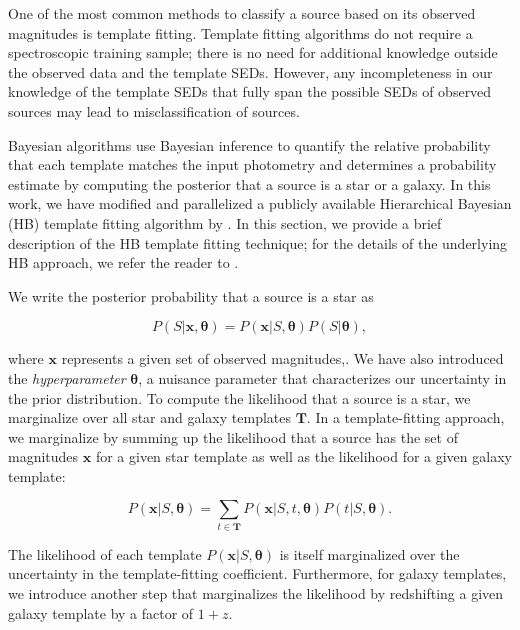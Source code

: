 \documentclass[useAMS,usenatbib]{mn2e}
\begin{document}
One of the most common methods to classify a source
based on its observed magnitudes is template fitting.
Template fitting algorithms do not require a spectroscopic training sample;
there is no need for additional knowledge outside the
observed data and the template SEDs.
However, any incompleteness in our knowledge of the template SEDs
that fully span the possible SEDs of observed sources
may lead to misclassification of sources.

Bayesian algorithms use Bayesian inference to quantify
the relative probability that each template matches
the input photometry
and determines a probability estimate by computing
the posterior that a source is a star or a galaxy.
In this work, we have modified and parallelized
a publicly available Hierarchical Bayesian (HB) template fitting
algorithm by \cite{Fadely2012}.
In this section, we provide a brief description
of the HB template fitting technique;
for the details of the underlying HB approach,
we refer the reader to \cite{Fadely2012}.

We write the posterior probability that a source is a star as

\begin{equation}
P \left( S | \mathbf{x}, \mathbf{\theta} \right)
= P \left( \mathbf{x} | S, \mathbf{\theta} \right)
P \left( S | \mathbf{\theta} \right),
\end{equation}

\noindent
where $\mathbf{x}$ represents a given set of observed magnitudes,.
We have also introduced the \textit{hyperparameter} $\mathbf{\theta}$,
a nuisance parameter that characterizes our uncertainty
in the prior distribution.
To compute the likelihood that a source is a star,
we marginalize over all star and galaxy templates $\mathbf{T}$.
In a template-fitting approach,
we marginalize by summing up
the likelihood that a source has the set of magnitudes $\mathbf{x}$
for a given star template
as well as the likelihood for a given galaxy template:

\begin{equation}
  P \left(\mathbf{x} | S, \mathbf{\theta} \right)
  = \sum_{t \in \mathbf{T}}
  P \left(\mathbf{x} | S, t, \mathbf{\theta} \right)
  P \left(t | S, \mathbf{\theta} \right).
  \label{eq:marginalize_template}
\end{equation}

\noindent
The likelihood of each template
$P \left( \mathbf{x} | S, \mathbf{\theta} \right)$
is itself marginalized over the uncertainty
in the template-fitting coefficient.
Furthermore, for galaxy templates, we introduce another step that 
marginalizes the likelihood by redshifting a given galaxy template
by a factor of $1 + z$.
\end{document}

